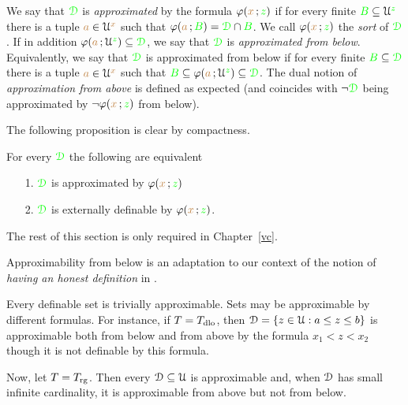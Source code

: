 \begin{definition}\label{def_approx}
We say that ${\color{green}\EuScript D}$ is \emph{approximated\/} by the formula $\varphi({\color{brown} x}\,;{\color{green} z})$ if for every finite ${\color{green} B}\subseteq\EuScript U^{\color{green} z}$ there is a tuple ${\color{brown} a}\in\EuScript U^{\color{brown} x}$ such that $\varphi({\color{brown} a}\,;{\color{green} B})={\color{green}\EuScript D}\cap{\color{green}B}$.
We call $\varphi({\color{brown} x}\,;{\color{green} z})$ the \emph{sort} of ${\color{green}\EuScript D}$.
If in addition $\varphi({\color{brown} a}\,;\EuScript U^{\color{green} z})\subseteq{\color{green}\EuScript D}$, we say that  ${\color{green}\EuScript D}$ is \emph{approximated from below}.
Equivalently, we say that  ${\color{green}\EuScript D}$ is approximated from below if for every finite ${\color{green} B}\subseteq{\color{green}\EuScript D}$ there is a tuple ${\color{brown} a}\in\EuScript U^{\color{brown} x}$ such that  ${\color{green} B}\subseteq\varphi({\color{brown} a}\,;\EuScript U^{\color{green} z})\subseteq{\color{green}\EuScript D}$.
The dual notion of \emph{approximation from above\/} is defined as expected (and coincides with $\neg{\color{green}\EuScript D}$ being approximated by $\neg\varphi({\color{brown} x}\,;{\color{green} z})$ from below).
\end{definition} 

The following proposition is clear by compactness.

\begin{proposition}\label{prop_approx=external}
   For every ${\color{green}\EuScript D}$ the following are equivalent
   \begin{itemize}
   \item[1.] ${\color{green}\EuScript D}$ is approximated by $\varphi({\color{brown} x}\,;{\color{green} z})$
   \item[2.] ${\color{green}\EuScript D}$ is externally definable by $\varphi({\color{brown} x}\,;{\color{green} z})$.
   \end{itemize}
\end{proposition}

The rest of this section is only required in Chapter~\ref{vc}.

Approximability from below is an adaptation to our context of the notion of \textit{having an honest definition} in \cite{CS}.

\begin{example}
Every definable set is trivially approximable.
Sets may be approximable by different formulas.
For instance, if $T=T_{\rm dlo}$, then $\EuScript D=\{z\in\EuScript U:a\le z\le b\}$ is approximable both from below and from above by the formula $x_1<z<x_2$ though it is not definable by this formula.

Now, let $T=T_{\rm rg}$.
Then every $\EuScript D\subseteq\EuScript U$ is approximable and, when $\EuScript D$ has small infinite cardinality, it is approximable from above but not from below.
\end{example}


